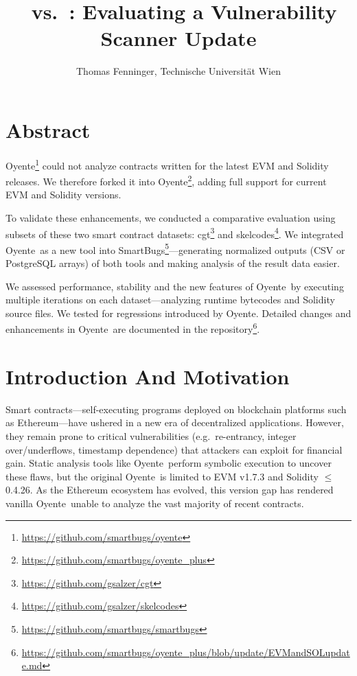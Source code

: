 \documentclass{article}
\title{\OY\ vs.\ \OYp: Evaluating a Vulnerability Scanner Update}
\author{Thomas Fenninger, Technische Universität Wien}
\newcommand\OY{Oyente}
\newcommand\OYp{\OY\raisebox{0.3ex}{\smaller +}}
\begin{document}
  	\maketitle

	\section*{Abstract}
	\OY\footnote{\url{https://github.com/smartbugs/oyente}} could not analyze contracts written for the latest EVM and Solidity releases. We therefore forked it into \OYp\footnote{\url{https://github.com/smartbugs/oyente_plus}}, adding full support for current EVM and Solidity versions.

	To validate these enhancements, we conducted a comparative evaluation using subsets of these two smart contract datasets: cgt\footnote{\url{https://github.com/gsalzer/cgt}} and skelcodes\footnote{\url{https://github.com/gsalzer/skelcodes}}. We integrated \OYp\ as a new tool into SmartBugs\footnote{\url{https://github.com/smartbugs/smartbugs}}—generating normalized outputs (CSV or PostgreSQL arrays) of both tools and making analysis of the result data easier.

	We assessed performance, stability and the new features of \OYp\ by executing multiple iterations on each dataset—analyzing runtime bytecodes and Solidity source files. We tested for regressions introduced by \OYp. Detailed changes and enhancements in \OYp\ are documented in the repository\footnote{\url{https://github.com/smartbugs/oyente_plus/blob/update/EVMandSOLupdate.md}}.

	\newpage
	\tableofcontents
	\newpage
	\listoftables
	\newpage

	\section{Introduction And Motivation}
	Smart contracts—self-executing programs deployed on blockchain platforms such as Ethereum—have ushered in a new era of decentralized applications.  However, they remain prone to critical vulnerabilities (e.g.\ re-entrancy, integer over/underflows, timestamp dependence) that attackers can exploit for financial gain.  Static analysis tools like \OY\ perform symbolic execution to uncover these flaws, but the original \OY\ is limited to EVM v1.7.3 and Solidity $\le$ 0.4.26.  As the Ethereum ecosystem has evolved, this version gap has rendered vanilla \OY\ unable to analyze the vast majority of recent contracts.
\end{document}
